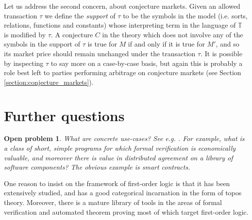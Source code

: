 \documentclass[english,letter paper,12pt,reqno]{article}
\theoremstyle{example}
\newtheorem{problem}[theorem]{Open problem}
\begin{document}
Let us address the second concern, about conjecture markets. Given an allowed transaction $\tau$ we define the \emph{support} of $\tau$ to be the symbols in the model (i.e. sorts, relations, functions and constants) whose interpreting term in the language of $\mathbb{T}$ is modified by $\tau$. A conjecture $C$ in the theory which does not involve any of the symbols in the support of $\tau$ is true for $M$ if and only if it is true for $M'$, and so its market price should remain unchanged under the transaction $\tau$. It is possible by inspecting $\tau$ to say more on a case-by-case basis, but again this is probably a role best left to parties performing arbitrage on conjecture markets (see Section \ref{section:conjecture_markets}).

\section{Further questions}


\begin{problem} What are concrete use-cases? See e.g. \cite{claessen}. For example, what is a class of short, simple programs for which formal verification is economically valuable, and moreover there is value in distributed agreement on a library of software components? The obvious example is smart contracts.
\end{problem}

One reason to insist on the framework of first-order logic is that it has been extensively studied, and has a good categorical incarnation in the form of topos theory. Moreover, there is a mature library of tools in the areas of formal verification and automated theorem proving most of which target first-order logic. %
\end{document}
